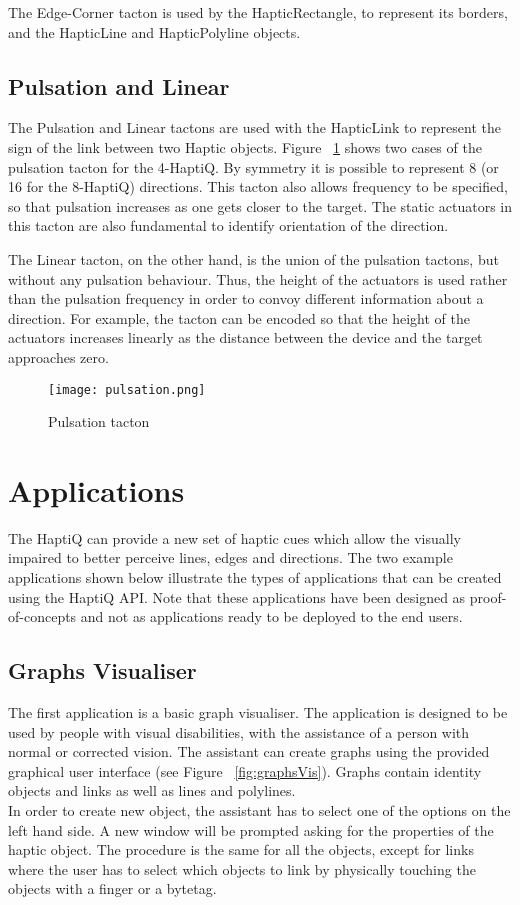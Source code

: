 The Edge-Corner tacton is used by the HapticRectangle, to represent its borders, and the HapticLine and HapticPolyline objects. 

\subsection{Pulsation and Linear}
The Pulsation and Linear tactons are used with the HapticLink to represent the sign of the link between two Haptic objects. Figure ~\ref{fig:pulsation} shows two cases of the pulsation tacton for the 4-HaptiQ. By symmetry it is possible to represent 8 (or 16 for the 8-HaptiQ) directions. This tacton also allows frequency to be specified, so that pulsation increases as one gets closer to the target. The static actuators in this tacton are also fundamental to identify orientation of the direction.

The Linear tacton, on the other hand, is the union of the pulsation tactons, but without any pulsation behaviour. Thus, the height of the actuators is used rather than the pulsation frequency in order to convoy different information about a direction. For example, the tacton can be encoded so that the height of the actuators increases linearly as the distance between the device and the target approaches zero.

\begin{figure}[H]
  \centering
  \texttt{[image: pulsation.png]}
  \caption{Pulsation tacton}
  \label{fig:pulsation}
\end{figure}

\section{Applications}

The HaptiQ can provide a new set of haptic cues which allow the visually impaired to better perceive lines, edges and directions. The two example applications shown below illustrate the types of applications that can be created using the HaptiQ API. Note that these applications have been designed as proof-of-concepts and not as applications ready to be deployed to the end users.

\subsection{Graphs Visualiser}
\label{sec:graphVis}

The first application is a basic graph visualiser. The application is designed to be used by people with visual disabilities, with the assistance of a person with normal or corrected vision. The assistant can create graphs using the provided graphical user interface (see Figure ~\ref{fig:graphsVis}). Graphs contain identity objects and links as well as lines and polylines. \\
In order to create new object, the assistant has to select one of the options on the left hand side. A new window will be prompted asking for the properties of the haptic object. The procedure is the same for all the objects, except for links where the user has to select which objects to link by physically touching the objects with a finger or a bytetag. 

